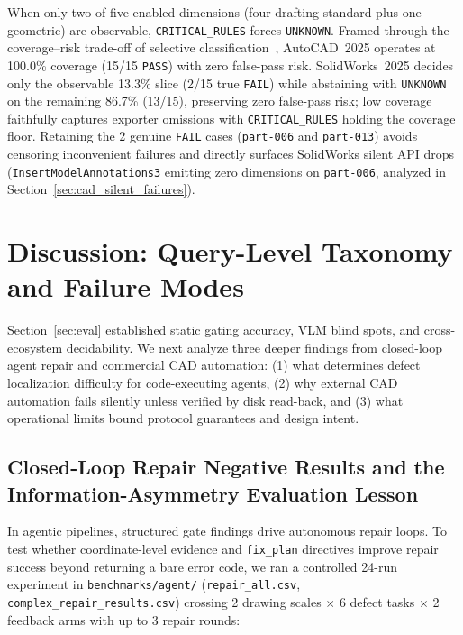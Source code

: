 \documentclass[nocopyright,nolists,upint,varvw,hyphenate]{asmejour}
\begin{document}
When only two of five enabled dimensions (four drafting-standard plus one geometric) are observable, \texttt{CRITICAL\_RULES} forces \texttt{UNKNOWN}. Framed through the coverage--risk trade-off of selective classification~\cite{geifman2017selective}, AutoCAD~2025 operates at 100.0\% coverage (15/15 \texttt{PASS}) with zero false-pass risk. SolidWorks~2025 decides only the observable 13.3\% slice (2/15 true \texttt{FAIL}) while abstaining with \texttt{UNKNOWN} on the remaining 86.7\% (13/15), preserving zero false-pass risk; low coverage faithfully captures exporter omissions with \texttt{CRITICAL\_RULES} holding the coverage floor. Retaining the 2 genuine \texttt{FAIL} cases (\texttt{part-006} and \texttt{part-013}) avoids censoring inconvenient failures and directly surfaces SolidWorks silent API drops (\texttt{InsertModelAnnotations3} emitting zero dimensions on \texttt{part-006}, analyzed in Section~\ref{sec:cad_silent_failures}).

\section{Discussion: Query-Level Taxonomy and Failure Modes}\label{sec:discussion}

Section~\ref{sec:eval} established static gating accuracy, VLM blind spots, and cross-ecosystem decidability. We next analyze three deeper findings from closed-loop agent repair and commercial CAD automation: (1) what determines defect localization difficulty for code-executing agents, (2) why external CAD automation fails silently unless verified by disk read-back, and (3) what operational limits bound protocol guarantees and design intent.

\subsection{Closed-Loop Repair Negative Results and the Information-Asymmetry Evaluation Lesson}\label{sec:repair_neg}

In agentic pipelines, structured gate findings drive autonomous repair loops. To test whether coordinate-level evidence and \texttt{fix\_plan} directives improve repair success beyond returning a bare error code, we ran a controlled 24-run experiment in \texttt{benchmarks/\allowbreak agent/} (\texttt{repair\_\allowbreak all.csv}, \texttt{complex\_\allowbreak repair\_\allowbreak results.csv}) crossing 2 drawing scales $\times$ 6 defect tasks $\times$ 2 feedback arms with up to 3 repair rounds:
\end{document}
